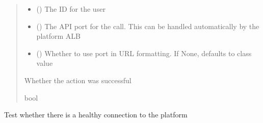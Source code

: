 \documentclass[letterpaper,10pt,english]{sphinxmanual}
\begin{document}
\begin{fulllineitems}
\begin{fulllineitems}
\begin{quote}
\begin{description}
\begin{itemize}
\item {} 
\sphinxAtStartPar
{} () \textendash{} The ID for the user

\item {} 
\sphinxAtStartPar
{} (\sphinxstyleliteralemphasis{\sphinxupquote{ (}}\sphinxstyleliteralemphasis{\sphinxupquote{)}}) \textendash{} The API port for the call. This can be handled automatically by the platform ALB

\item {} 
\sphinxAtStartPar
{} (\sphinxstyleliteralemphasis{\sphinxupquote{ (}}\sphinxstyleliteralemphasis{\sphinxupquote{)}}) \textendash{} Whether to use port in URL formatting. If None, defaults to class value

\end{itemize}

\sphinxAtStartPar
{} \textendash{} Whether the action was successful

\sphinxAtStartPar
bool

\end{description}\end{quote}

\end{fulllineitems}


\begin{fulllineitems}
\label{\detokenize{aisquared.platform:aisquared.platform.AISquaredPlatformClient.AISquaredPlatformClient.test_connection}}
\pysigstartsignatures
{}
\pysigstopsignatures
\sphinxAtStartPar
Test whether there is a healthy connection to the platform


\end{fulllineitems}
\end{fulllineitems}
\end{document}
